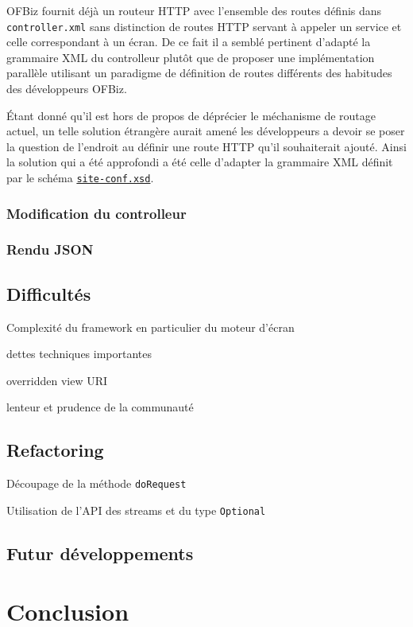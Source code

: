 \documentclass[a4paper, 11pt]{report}
\begin{document}
OFBiz fournit déjà un routeur HTTP avec l'ensemble des routes définis
dans \verb=controller.xml= sans distinction de routes HTTP servant à
appeler un service et celle correspondant à un écran.  De ce fait il a
semblé pertinent d'adapté la grammaire XML du controlleur plutôt que
de proposer une implémentation parallèle utilisant un paradigme de
définition de routes différents des habitudes des développeurs OFBiz.

Étant donné qu'il est hors de propos de déprécier le méchanisme de
routage actuel, un telle solution étrangère aurait amené les
développeurs a devoir se poser la question de l'endroit au définir une
route HTTP qu'il souhaiterait ajouté.  Ainsi la solution qui a été
approfondi a été celle d'adapter la grammaire XML définit par le
schéma
\href{http://ofbiz.apache.org/dtds/site-conf.xsd}{\nolinkurl{site-conf.xsd}}.

\subsection{Modification du controlleur}

\subsection{Rendu JSON}

\section{Difficultés}

Complexité du framework en particulier du moteur d'écran

dettes techniques importantes

overridden view URI

lenteur et prudence de la communauté

\section{Refactoring}

Découpage de la méthode \verb=doRequest=

Utilisation de l'API des streams et du type \verb=Optional=

\section{Futur développements}

\chapter{Conclusion}

\clearpage



\end{document}
